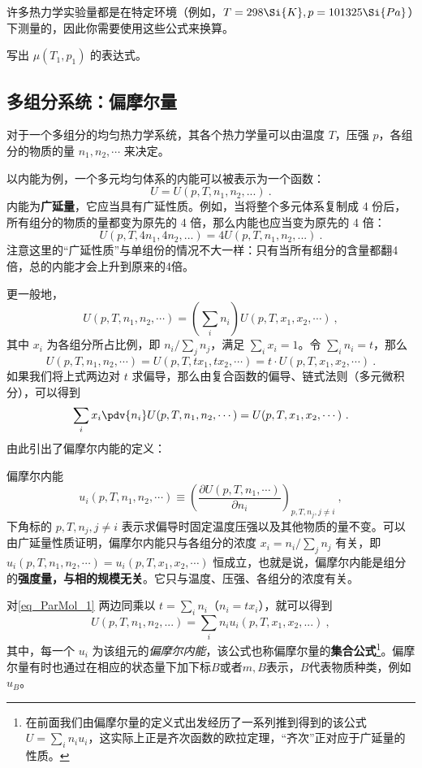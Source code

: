 许多热力学实验量都是在特定环境（例如，$T = 298 \Si{K}, p = 101325\Si{Pa}$）下测量的，因此你需要使用这些公式来换算。

\begin{exercise}{}
写出 $\mu(T_1,p_1)$ 的表达式。
\end{exercise}

\subsection{多组分系统：偏摩尔量}
对于一个多组分的均匀热力学系统，其各个热力学量可以由温度 $T$，压强 $p$，各组分的物质的量 $n_1,n_2,\cdots $ 来决定。

以内能为例，一个多元均匀体系的内能可以被表示为一个函数：
\begin{equation}
U = U (p, T, n_1, n_2, ...)~.
\end{equation}
内能为\textbf{广延量}，它应当具有广延性质。例如，当将整个多元体系复制成 4 份后，所有组分的物质的量都变为原先的 4 倍，那么内能也应当变为原先的 4 倍：
$$ U (p, T, 4n_1, 4n_2, ...) = 4U (p, T, n_1, n_2, ...)~.$$
注意这里的“广延性质”与单组份的情况不大一样：只有当所有组分的含量都翻4倍，总的内能才会上升到原来的4倍。

更一般地，
\begin{equation}
U(p,T,n_1,n_2,\cdots )=\left(\sum_i n_i\right) U(p,T,x_1,x_2,\cdots)~,
\end{equation}
其中 $x_i$ 为各组分所占比例，即 $n_i/\sum_j n_j$，满足 $\sum_i x_i=1$。令 $\sum_i n_i=t$，那么
\begin{equation}
U(p,T,n_1,n_2,\cdots)=U(p,T,tx_1,tx_2,\cdots)=t\cdot U(p,T,x_1,x_2,\cdots)~.
\end{equation}
如果我们将上式两边对 $t$ 求偏导，那么由复合函数的偏导、链式法则（多元微积分），可以得到
\begin{equation}\label{eq_ParMol_1}
\sum_i x_i \pdv{n_i} U(p,T,n_1,n_2,\cdots )=U(p,T,x_1,x_2,\cdots)~.
\end{equation}
由此引出了偏摩尔内能的定义：
\begin{definition}{偏摩尔内能}
\begin{equation}
u_i(p,T,n_1,n_2,\cdots )\equiv \left(\frac{\partial U(p,T,n_1,\cdots)}{\partial n_i}\right)_{p,T,n_j,j\neq i}~,
\end{equation}
下角标的 $p,T,n_j,j\neq i$ 表示求偏导时固定温度压强以及其他物质的量不变。可以由广延量性质证明，偏摩尔内能只与各组分的浓度 $x_i=n_i/\sum_j n_j$ 有关，即 $u_i(p,T,n_1,n_2,\cdots)=u_i(p,T,x_1,x_2,\cdots)$ 恒成立，也就是说，偏摩尔内能是组分的\textbf{强度量，与相的规模无关}。它只与温度、压强、各组分的浓度有关。
\end{definition}
对\autoref{eq_ParMol_1} 两边同乘以 $t=\sum_i n_i$（$n_i=tx_i$），就可以得到
\begin{equation}\label{eq_ParMol_2}
U (p, T, n_1, n_2, ...) = \sum_i n_i u_i(p, T, x_1, x_2, ...)~,
\end{equation}
其中，每一个 $u_i$ 为该组元的\textsl{偏摩尔内能}，该公式也称偏摩尔量的\textbf{集合公式}\footnote{在前面我们由偏摩尔量的定义式出发经历了一系列推到得到的该公式 $U=\sum_i n_i u_i$，这实际上正是齐次函数的欧拉定理，“齐次”正对应于广延量的性质。}。偏摩尔量有时也通过在相应的状态量下加下标$B$或者$m,B$表示，$B$代表物质种类，例如$u_B$。

